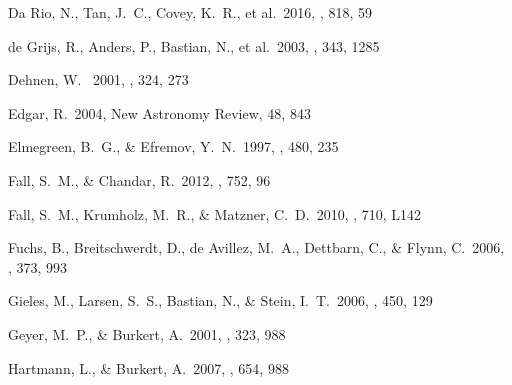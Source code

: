 \begin{thebibliography}


 Da Rio, N., Tan, J.~C., Covey, K.~R., et al.\ 2016, \apj, 818, 59 

 de Grijs, R., Anders, 
P., Bastian, N., et al.\ 2003, \mnras, 343, 1285 


 Dehnen, W. \ 2001, \mnras, 324, 273

 Edgar, R.\ 2004, New Astronomy Review, 48, 843 

 Elmegreen, B.~G., \& Efremov, Y.~N.\ 1997, \apj, 480, 235 


 Fall, S.~M., \& Chandar, R.\ 2012, \apj, 752, 96 

 Fall, S.~M., Krumholz, 
M.~R., \& Matzner, C.~D.\ 2010, \apjl, 710, L142

 Fuchs, B., Breitschwerdt, 
D., de Avillez, M.~A., Dettbarn, C., \& Flynn, C.\ 2006, \mnras, 373, 993 




 Gieles, M., Larsen, S.~S., Bastian, N., \& Stein, I.~T.\ 2006, \aap, 450, 129 

 Geyer, M.~P., \& Burkert, A.\ 2001, \mnras, 323, 988 



 Hartmann, L., \& Burkert, A.\ 2007, \apj, 654, 988 




\end{thebibliography}
